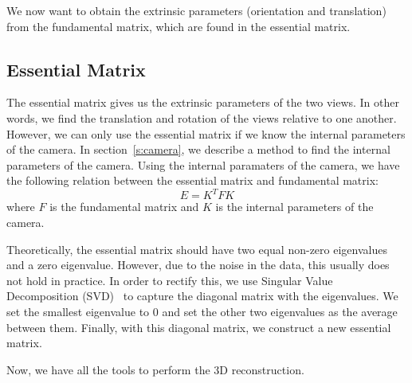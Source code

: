 We now want to obtain the extrinsic parameters (orientation and translation) from the fundamental matrix, which are found in the essential matrix.

\subsection{Essential Matrix}
The essential matrix gives us the extrinsic parameters of the two views. In other words, we find the translation and rotation of the views relative to one another. However, we can only use the essential matrix if we know the internal parameters of the camera. In section~\ref{s:camera}, we describe a method to find the internal parameters of the camera. Using the internal paramaters of the camera, we have the following relation between the essential matrix and fundamental matrix:
\begin{equation}
E = K^TFK
\end{equation}
where $F$ is the fundamental matrix and $K$ is the internal parameters of the camera.

Theoretically, the essential matrix should have two equal non-zero eigenvalues and a zero eigenvalue. However, due to the noise in the data, this usually does not hold in practice. In order to rectify this, we use Singular Value Decomposition (SVD)~\cite{svd} to capture the diagonal matrix with the eigenvalues. We set the smallest eigenvalue to 0 and set the other two eigenvalues as the average between them. Finally, with this diagonal matrix, we construct a new essential matrix.

Now, we have all the tools to perform the 3D reconstruction.
